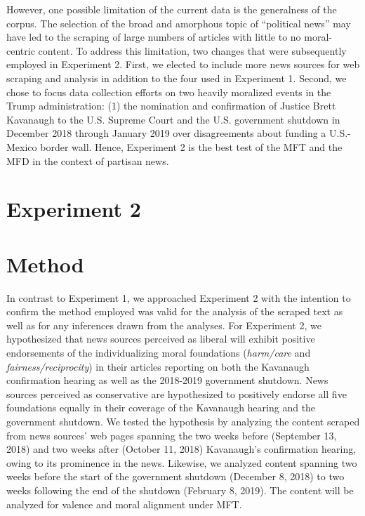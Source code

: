 \documentclass[
  english,
  man]{apa6}
\begin{document}
However, one possible limitation of the current data is the generalness of the corpus. The selection of the broad and amorphous topic of ``political news'' may have led to the scraping of large numbers of articles with little to no moral-centric content. To address this limitation, two changes that were subsequently employed in Experiment 2. First, we elected to include more news sources for web scraping and analysis in addition to the four used in Experiment 1. Second, we chose to focus data collection efforts on two heavily moralized events in the Trump administration: (1) the nomination and confirmation of Justice Brett Kavanaugh to the U.S. Supreme Court and the U.S. government shutdown in December 2018 through January 2019 over disagreements about funding a U.S.-Mexico border wall. Hence, Experiment 2 is the best test of the MFT and the MFD in the context of partisan news.

\hypertarget{experiment-2}{%
\section{Experiment 2}\label{experiment-2}}

\hypertarget{method-1}{%
\section{Method}\label{method-1}}

In contrast to Experiment 1, we approached Experiment 2 with the intention to confirm the method employed was valid for the analysis of the scraped text as well as for any inferences drawn from the analyses. For Experiment 2, we hypothesized that news sources perceived as liberal will exhibit positive endorsements of the individualizing moral foundations (\emph{harm/care} and \emph{fairness/reciprocity}) in their articles reporting on both the Kavanaugh confirmation hearing as well as the 2018-2019 government shutdown. News sources perceived as conservative are hypothesized to positively endorse all five foundations equally in their coverage of the Kavanaugh hearing and the government shutdown. We tested the hypothesis by analyzing the content scraped from news sources' web pages spanning the two weeks before (September 13, 2018) and two weeks after (October 11, 2018) Kavanaugh's confirmation hearing, owing to its prominence in the news. Likewise, we analyzed content spanning two weeks before the start of the government shutdown (December 8, 2018) to two weeks following the end of the shutdown (February 8, 2019). The content will be analyzed for valence and moral alignment under MFT.
\end{document}
